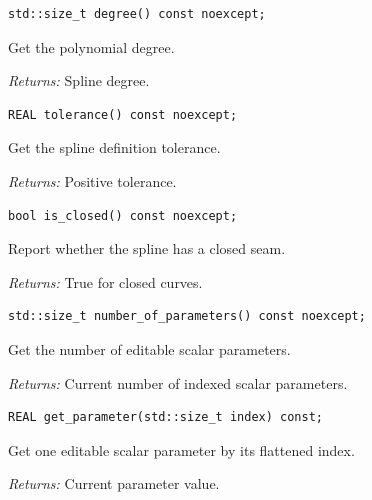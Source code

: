\par\noindent\begin{minipage}{\linewidth}
\begin{lstlisting}[style=apireference]
std::size_t degree() const noexcept;
\end{lstlisting}
{\footnotesize Get the polynomial degree.\par}
{\footnotesize\textit{Returns:} Spline degree.\par}
\end{minipage}\par\vspace{1pt}
\par\noindent\begin{minipage}{\linewidth}
\begin{lstlisting}[style=apireference]
REAL tolerance() const noexcept;
\end{lstlisting}
{\footnotesize Get the spline definition tolerance.\par}
{\footnotesize\textit{Returns:} Positive tolerance.\par}
\end{minipage}\par\vspace{1pt}
\par\noindent\begin{minipage}{\linewidth}
\begin{lstlisting}[style=apireference]
bool is_closed() const noexcept;
\end{lstlisting}
{\footnotesize Report whether the spline has a closed seam.\par}
{\footnotesize\textit{Returns:} True for closed curves.\par}
\end{minipage}\par\vspace{1pt}
\par\noindent\begin{minipage}{\linewidth}
\begin{lstlisting}[style=apireference]
std::size_t number_of_parameters() const noexcept;
\end{lstlisting}
{\footnotesize Get the number of editable scalar parameters.\par}
{\footnotesize\textit{Returns:} Current number of indexed scalar parameters.\par}
\end{minipage}\par\vspace{1pt}
\par\noindent\begin{minipage}{\linewidth}
\begin{lstlisting}[style=apireference]
REAL get_parameter(std::size_t index) const;
\end{lstlisting}
{\footnotesize Get one editable scalar parameter by its flattened index.\par}
{\footnotesize\textit{Returns:} Current parameter value.\par}
\end{minipage}\par\vspace{1pt}
